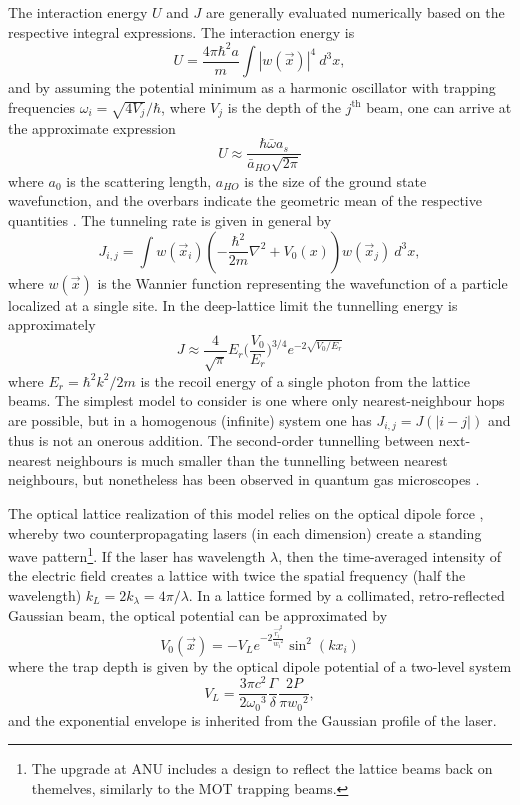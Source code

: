	The interaction energy $U$ and $J$ are generally evaluated numerically  based on the respective integral expressions.
	The interaction energy is
	\begin{equation}
		U = \frac{4\pi\hbar^2 a}{m}\int |w(\vec{x})|^4~d^3 x,
	\end{equation}
	and by assuming the potential minimum as a harmonic oscillator with trapping frequencies $\omega_i = \sqrt{4 V_j}/\hbar$, where $V_j$ is the depth of the $j^{\textrm{th}}$ beam, one can arrive at the approximate expression 
	\begin{equation}
		U \approx \frac{\hbar \bar{\omega}a_s}{\bar{a}_{HO}\sqrt{2\pi}}
	\end{equation}
	where $a_0$ is the scattering length, $a_{HO}$ is the size of the ground state wavefunction, and the overbars indicate the geometric mean of the respective quantities	\cite{Jaksch98}.
	The tunneling rate is given in general by
	\begin{equation}
		J_{i,j} = \int w(\vec{x}_i) \left(-\frac{\hbar^2}{2m}\nabla^2 + V_0(x)\right)w(\vec{x}_j)~d^3 x,
	\end{equation}
	where $w(\vec{x})$ is the Wannier function \cite{Wannier37,Marzari00} representing the wavefunction of a particle localized at a single site.
	In the deep-lattice limit the tunnelling energy is approximately \cite{Jaksch98}
	\begin{equation}
		J \approx \frac{4}{\sqrt{\pi}} E_r\Big(\frac{V_0}{E_r}\Big)^{3/4}e^{-2\sqrt{V_0/E_r}}
	\end{equation}
	where $E_r = \hbar^2k^2/2m$ is the recoil energy of a single photon from the lattice beams.
	The simplest model to consider is one where only nearest-neighbour hops are possible, but in a homogenous (infinite) system one has $J_{i,j} = J(|i-j|)$ and thus is not an onerous addition.
	The second-order tunnelling between next-nearest neighbours is much smaller than the tunnelling between nearest neighbours, but nonetheless has been observed in quantum gas microscopes \cite{Folling07}.
	
	The optical lattice realization of this model relies on the optical dipole force \cite{Grimm00}, whereby two counterpropagating lasers (in each dimension) create a standing wave pattern\footnote{The upgrade at ANU includes a design to reflect the lattice beams back on themelves, similarly to the MOT trapping beams.}.
	If the laser has wavelength $\lambda$, then the time-averaged intensity of the electric field creates a lattice with twice the spatial frequency (half the wavelength) $k_L = 2k_\lambda = 4\pi/\lambda$.
	In a lattice formed by a collimated, retro-reflected Gaussian beam, the optical potential can be approximated by
	\begin{equation}
		V_0(\vec{x}) = - V_{L} e^{-2\frac{{\vec{r_i}}^2}{{w_i}^2}} \sin^2(k x_i)
	\end{equation}
	where the trap depth is given by the optical dipole potential of a two-level system \cite{Grimm00}
	\begin{equation}
		V_{L} = \frac{3\pi c^2}{2{\omega_0}^3}\frac{\Gamma}{\delta}\frac{2P}{\pi {w_0}^2},
	\end{equation}
	and the exponential envelope is inherited from the Gaussian profile of the laser.
	

